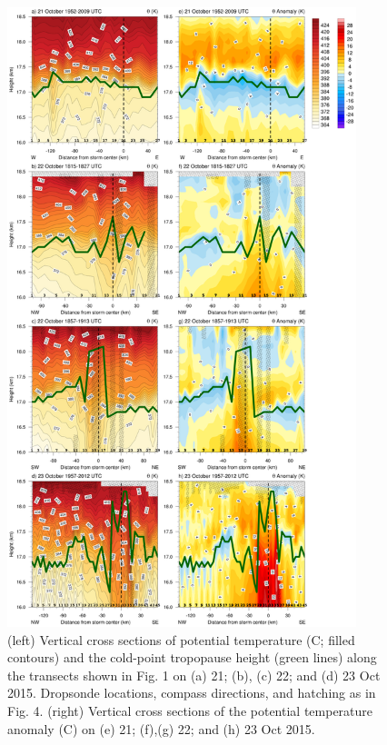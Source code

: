 \begin{figure}[ht]
\centerline{\includegraphics[width=24pc]{figures/fig05_theta+anomalies.png}}
\caption{(left) Vertical cross sections of potential temperature (\textdegree{}C; filled contours) and the cold-point tropopause height (green lines) along the transects shown in Fig. 1 on (a) 21; (b), (c) 22; and (d) 23 Oct 2015. Dropsonde locations, compass directions, and hatching as in Fig. 4. (right) Vertical cross sections of the potential temperature anomaly (\textdegree{}C) on (e) 21; (f),(g) 22; and (h) 23 Oct 2015.}
\label{fig:anomalies}
\end{figure}

